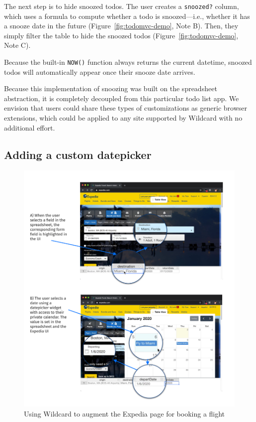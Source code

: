 \documentclass[english,submission]{programming}
\begin{document}
The next step is to hide snoozed todos. The user creates a
\texttt{snoozed?} column, which uses a formula to compute whether a todo
is snoozed---i.e., whether it has a snooze date in the future{
(Figure~\ref{fig:todomvc-demo}, Note B)}. Then, they simply filter the
table to hide the snoozed todos{ (Figure~\ref{fig:todomvc-demo}, Note
C)}.

Because the built-in \texttt{NOW()} function always returns the current
datetime, snoozed todos will automatically appear once their snooze date
arrives.

Because this implementation of snoozing was built on the spreadsheet
abstraction, it is completely decoupled from this particular todo list
app. We envision that users could share these types of customizations as
generic browser extensions, which could be applied to any site supported
by Wildcard with no additional effort.

\hypertarget{adding-a-custom-datepicker}{%
\subsection{Adding a custom
datepicker}\label{adding-a-custom-datepicker}}

\begin{figure}
\hypertarget{fig:expedia-demo}{%
\centering
\includegraphics{media/expedia-demo-300dpi.png}
\caption{Using Wildcard to augment the Expedia page for booking a
flight}\label{fig:expedia-demo}
}
\end{figure}
\end{document}
